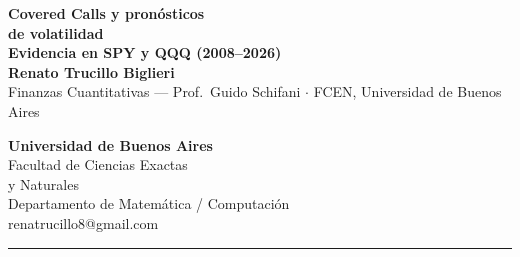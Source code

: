 \documentclass[a0,portrait]{a0poster}
\begin{document}
\begin{minipage}[t]{0.72\linewidth}
  \vspace{0pt}
  {\VeryHuge\color{ku}\bfseries Covered Calls y pronósticos\\[0.2cm] de volatilidad}\\[0.6cm]
  {\huge\bfseries Evidencia en SPY y QQQ (2008--2026)}\\[0.7cm]
  {\LARGE\bfseries Renato Trucillo Biglieri }\\[0.3cm]
  {\Large Finanzas Cuantitativas --- Prof.\ Guido Schifani $\cdot$ FCEN, Universidad de Buenos Aires}
\end{minipage}%
\begin{minipage}[t]{0.28\linewidth}
  \vspace{0pt}
  \raggedleft\color{DarkSlateGray}
  {\LARGE\bfseries Universidad de Buenos Aires}\\[0.25cm]
  {\Large Facultad de Ciencias Exactas\\ y Naturales}\\[0.25cm]
  {\Large Departamento de Matemática / Computación}\\[0.3cm]
  {\large\ttfamily renatrucillo8@gmail.com}
\end{minipage}

\vspace{0.8cm}
{\color{ku}\rule{\linewidth}{5pt}}
\vspace{0.2cm}
\end{document}
